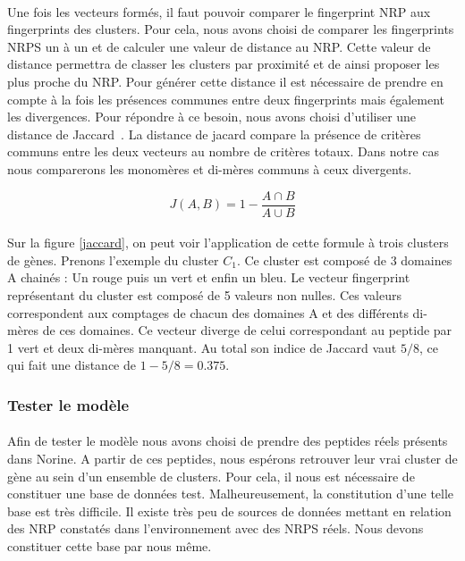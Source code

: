 \documentclass[12pt,french,twoside]{report}
\begin{document}
\paragraph{}Une fois les vecteurs formés, il faut pouvoir comparer le fingerprint NRP aux fingerprints des clusters.
Pour cela, nous avons choisi de comparer les fingerprints NRPS un à un et de calculer une valeur de distance au NRP.
Cette valeur de distance permettra de classer les clusters par proximité et de ainsi proposer les plus proche du NRP.
Pour générer cette distance il est nécessaire de prendre en compte à la fois les présences communes entre deux fingerprints mais également les divergences.
Pour répondre à ce besoin, nous avons choisi d'utiliser une distance de Jaccard~\cite{jaccard_etude_1901}.
La distance de jacard compare la présence de critères communs entre les deux vecteurs au nombre de critères totaux.
Dans notre cas nous comparerons les monomères et di-mères communs à ceux divergents.

\begin{equation}
  J(A,B) = 1 - \frac{A \cap B}{A \cup B}
\end{equation}

\paragraph{}Sur la figure \ref{jaccard}, on peut voir l'application de cette formule à trois clusters de gènes.
Prenons l'exemple du cluster $C_1$.
Ce cluster est composé de 3 domaines A chainés : Un rouge puis un vert et enfin un bleu.
Le vecteur fingerprint représentant du cluster est composé de 5 valeurs non nulles.
Ces valeurs correspondent aux comptages de chacun des domaines A et des différents di-mères de ces domaines.
Ce vecteur diverge de celui correspondant au peptide par 1 vert et deux di-mères manquant.
Au total son indice de Jaccard vaut $5 / 8$, ce qui fait une distance de $1 - 5/8 = 0.375$.





\subsubsection{Tester le modèle}

\paragraph{}Afin de tester le modèle nous avons choisi de prendre des peptides réels présents dans Norine.
A partir de ces peptides, nous espérons retrouver leur vrai cluster de gène au sein d'un ensemble de clusters.
Pour cela, il nous est nécessaire de constituer une base de données test.
Malheureusement, la constitution d'une telle base est très difficile.
Il existe très peu de sources de données mettant en relation des NRP constatés dans l'environnement avec des NRPS réels.
Nous devons constituer cette base par nous même.
\end{document}
